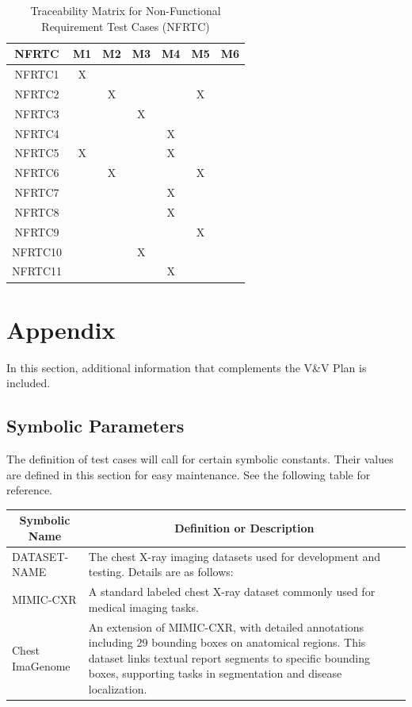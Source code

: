 \documentclass[12pt, titlepage]{article}
\begin{document}
\begin{table}[h!]
  \centering
  \caption{Traceability Matrix for Non-Functional Requirement Test Cases (NFRTC)}
  \begin{tabular}{|c|c|c|c|c|c|c|}
    \hline
    \textbf{NFRTC} & \textbf{M1} & \textbf{M2} & \textbf{M3} & \textbf{M4} & \textbf{M5} & \textbf{M6} \\
    \hline
    NFRTC1 & X &   &   &   &   &   \\
    \hline
    NFRTC2 &   & X &   &   & X &   \\
    \hline
    NFRTC3 &   &   & X &   &   &   \\
    \hline
    NFRTC4 &   &   &   & X &   &   \\
    \hline
    NFRTC5 & X &   &   & X &   &   \\
    \hline
    NFRTC6 &   & X &   &   & X &   \\
    \hline
    NFRTC7 &   &   &   & X &   &   \\
    \hline
    NFRTC8 &   &   &   & X &   &   \\
    \hline
    NFRTC9 &   &   &   &   & X &   \\
    \hline
    NFRTC10 &   &   & X &   &   &   \\
    \hline
    NFRTC11 &   &   &   & X &   &   \\
    \hline
  \end{tabular}
\end{table}


\pagebreak
\newpage

\section{Appendix}
In this section, additional information that complements the V\&V Plan is included.

\subsection{Symbolic Parameters}
The definition of test cases will call for certain symbolic constants. Their values are defined in this section for easy maintenance. See the following table for reference.

\begin{table}[h]
  \centering
  \begin{tabular}{|p{}|p{}|}
    \hline
    \multicolumn{1}{|c|}{\textbf{Symbolic Name}} & \multicolumn{1}{c|}{\textbf{Definition or Description}} \\ \hline
    DATASET-NAME & The chest X-ray imaging datasets used for development and testing. Details are as follows: \\ \hline
    MIMIC-CXR & A standard labeled chest X-ray dataset commonly used for medical imaging tasks. \\ \hline
    Chest ImaGenome & An extension of MIMIC-CXR, with detailed annotations including 29 bounding boxes on anatomical regions. This dataset links textual report segments to specific bounding boxes, supporting tasks in segmentation and disease localization. \\ \hline
  \end{tabular}
\end{table}
\end{document}
